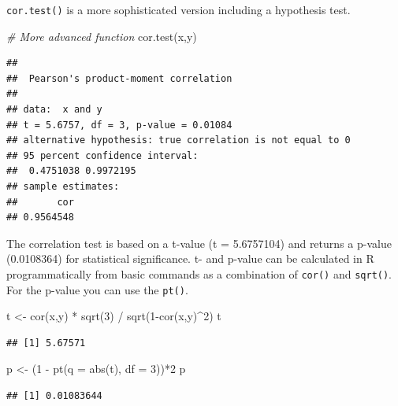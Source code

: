 \documentclass[
]{book}
\newenvironment{Shaded}{\begin{snugshade}}{\end{snugshade}}
\newcommand{\AttributeTok}[1]{\textcolor[rgb]{0.77,0.63,0.00}{#1}}
\newcommand{\CommentTok}[1]{\textcolor[rgb]{0.56,0.35,0.01}{\textit{#1}}}
\newcommand{\DecValTok}[1]{\textcolor[rgb]{0.00,0.00,0.81}{#1}}
\newcommand{\FunctionTok}[1]{\textcolor[rgb]{0.00,0.00,0.00}{#1}}
\newcommand{\NormalTok}[1]{#1}
\newcommand{\OtherTok}[1]{\textcolor[rgb]{0.56,0.35,0.01}{#1}}
\newcommand{\SpecialCharTok}[1]{\textcolor[rgb]{0.00,0.00,0.00}{#1}}
\begin{document}
\texttt{cor.test()} is a more sophisticated version including a hypothesis test.

\begin{Shaded}
\begin{Highlighting}[]
\CommentTok{\# More advanced function }
\FunctionTok{cor.test}\NormalTok{(x,y)}
\end{Highlighting}
\end{Shaded}

\begin{verbatim}
## 
##  Pearson's product-moment correlation
## 
## data:  x and y
## t = 5.6757, df = 3, p-value = 0.01084
## alternative hypothesis: true correlation is not equal to 0
## 95 percent confidence interval:
##  0.4751038 0.9972195
## sample estimates:
##       cor 
## 0.9564548
\end{verbatim}

The correlation test is based on a t-value (t = 5.6757104) and returns a p-value (0.0108364) for statistical significance. t- and p-value can be calculated in R programmatically from basic commands as a combination of \texttt{cor()} and \texttt{sqrt()}. For the p-value you can use the \texttt{pt()}.

\begin{Shaded}
\begin{Highlighting}[]
\NormalTok{t }\OtherTok{\textless{}{-}} \FunctionTok{cor}\NormalTok{(x,y) }\SpecialCharTok{*} \FunctionTok{sqrt}\NormalTok{(}\DecValTok{3}\NormalTok{) }\SpecialCharTok{/} \FunctionTok{sqrt}\NormalTok{(}\DecValTok{1}\SpecialCharTok{{-}}\FunctionTok{cor}\NormalTok{(x,y)}\SpecialCharTok{\^{}}\DecValTok{2}\NormalTok{) }
\NormalTok{t}
\end{Highlighting}
\end{Shaded}

\begin{verbatim}
## [1] 5.67571
\end{verbatim}

\begin{Shaded}
\begin{Highlighting}[]
\NormalTok{p }\OtherTok{\textless{}{-}}\NormalTok{ (}\DecValTok{1} \SpecialCharTok{{-}} \FunctionTok{pt}\NormalTok{(}\AttributeTok{q =} \FunctionTok{abs}\NormalTok{(t), }\AttributeTok{df =} \DecValTok{3}\NormalTok{))}\SpecialCharTok{*}\DecValTok{2}
\NormalTok{p}
\end{Highlighting}
\end{Shaded}

\begin{verbatim}
## [1] 0.01083644
\end{verbatim}
\end{document}
